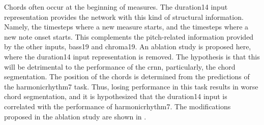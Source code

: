 
Chords often occur at the beginning of measures. The
\gls{duration14} input representation provides the network
with this kind of structural information. Namely, the
timesteps where a new measure starts, and the timesteps
where a new note onset starts. This complements the
pitch-related information provided by the other inputs,
\gls{bass19} and \gls{chroma19}. An ablation study is
proposed here, where the \gls{duration14} input
representation is removed. The hypothesis is that this will
be detrimental to the performance of the \gls{crnn},
particularly, the chord segmentation. The position of the
chords is determined from the predictions of the
\gls{harmonicrhythm7} task. Thus, losing performance in this
task results in worse chord segmentation, and it is
hypothesized that the \gls{duration14} input is correlated
with the performance of \gls{harmonicrhythm7}. The
modifications proposed in the ablation study are shown in
.

